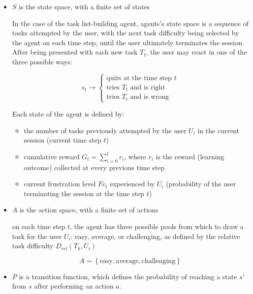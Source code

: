 \begin{itemize}
    \item $S$ is the state space, with a finite set of states

    In the case of the task list-building agent, agents's state space is a sequence of tasks attempted by the user, with the next task difficulty being selected by the agent on each time step, until the user ultimately terminates the session.
    After being presented with each new task $T_t$, the user may react in one of the three possible ways:

    \begin{equation} \label{eq:mdp_state_space}
        s_t \to
        \begin{cases}
            \text{quits at the time step } t \\
            \text{tries } T_t \text{ and is right} \\
            \text{tries } T_t \text{ and is wrong}
        \end{cases}
    \end{equation}

    Each state of the agent is defined by:

    \begin{itemize}
        \item the number of tasks previously attempted by the user $U_i$ in the current session (current time step $t$)
        \item cumulative reward $G_t = \sum \limits_{i=0}^t r_i$, where $r_i$ is the reward (learning outcome) collected at every previous time step
        \item current frustration level $Fc_t$ experienced by $U_i$ (probability of the user terminating the session at the time step $t$)
    \end{itemize}

    \item $A$ is the action space, with a finite set of actions

    on each time step $t$, the agent has three possible pools from which to draw a task for the user $U_i$: easy, average, or challenging, as defined by the relative task difficulty $D_{rel}(T_k, U_i)$

    \begin{equation}
        A = \left\{ \text{easy}, \text{average}, \text{challenging} \right\}
    \end{equation}

    \item $P$ is a transition function, which defines the probability of reaching a state $s'$ from $s$ after performing an action $a$.


\end{itemize}
